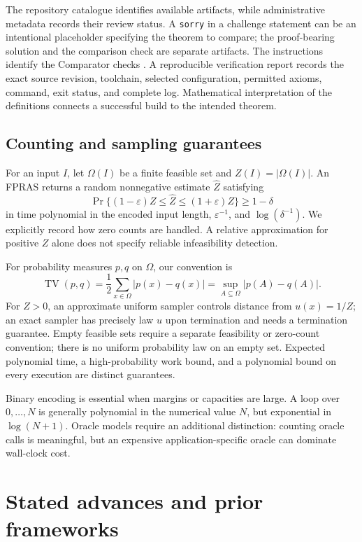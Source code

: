 \documentclass[11pt]{article}
\newcommand{\TV}{\operatorname{TV}}
\begin{document}
The repository catalogue identifies available artifacts, while administrative metadata records their review status. A \texttt{sorry} in a challenge statement can be an intentional placeholder specifying the theorem to compare; the proof-bearing solution and the comparison check are separate artifacts. The instructions identify the Comparator checks \cite{comparator}. A reproducible verification report records the exact source revision, toolchain, selected configuration, permitted axioms, command, exit status, and complete log. Mathematical interpretation of the definitions connects a successful build to the intended theorem.

\subsection{Counting and sampling guarantees}
For an input \(I\), let \(\Omega(I)\) be a finite feasible set and \(Z(I)=|\Omega(I)|\). An FPRAS returns a random nonnegative estimate \(\widehat Z\) satisfying
\[
 \Pr\{(1-\varepsilon)Z\leq\widehat Z\leq(1+\varepsilon)Z\}
 \geq 1-\delta
\]
in time polynomial in the encoded input length, \(\varepsilon^{-1}\), and \(\log(\delta^{-1})\). We explicitly record how zero counts are handled. A relative approximation for positive \(Z\) alone does not specify reliable infeasibility detection.

For probability measures \(p,q\) on \(\Omega\), our convention is
\[
 \TV(p,q)=\frac12\sum_{x\in\Omega}|p(x)-q(x)|
          =\sup_{A\subseteq\Omega}|p(A)-q(A)|.
\]
For \(Z>0\), an approximate uniform sampler controls distance from \(u(x)=1/Z\); an exact sampler has precisely law \(u\) upon termination and needs a termination guarantee. Empty feasible sets require a separate feasibility or zero-count convention; there is no uniform probability law on an empty set. Expected polynomial time, a high-probability work bound, and a polynomial bound on every execution are distinct guarantees.

Binary encoding is essential when margins or capacities are large. A loop over \(0,\ldots,N\) is generally polynomial in the numerical value \(N\), but exponential in \(\log(N+1)\). Oracle models require an additional distinction: counting oracle calls is meaningful, but an expensive application-specific oracle can dominate wall-clock cost.

\section{Stated advances and prior frameworks}
\end{document}
